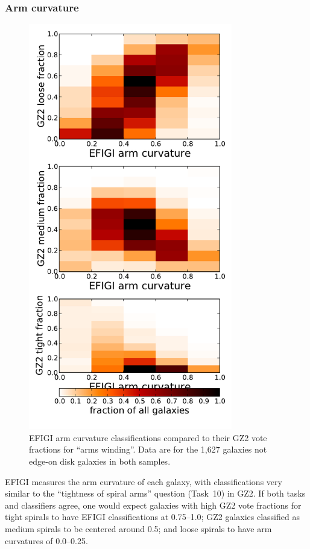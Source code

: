 \documentclass[useAMS,usenatbib]{mn2e}
\begin{document}
\subsubsection{Arm curvature}

\begin{figure}
\includegraphics[angle=0,width=3.5in]{figures/efigi_arm_curvature.pdf}
\caption{EFIGI arm curvature classifications compared to their GZ2 vote fractions for ``arms winding''. Data are for the 1,627 galaxies not edge-on disk galaxies in both samples.  
\label{fig-efigi_arms}}
\end{figure}

EFIGI measures the arm curvature of each galaxy, with classifications very similar to the ``tightness of spiral arms'' question (Task~10) in GZ2. If both tasks and classifiers agree, one would expect galaxies with high GZ2 vote fractions for tight spirals to have EFIGI classifications at 0.75--1.0; GZ2 galaxies classified as medium spirals to be centered around 0.5; and loose spirals to have arm curvatures of 0.0--0.25. 
\end{document}
